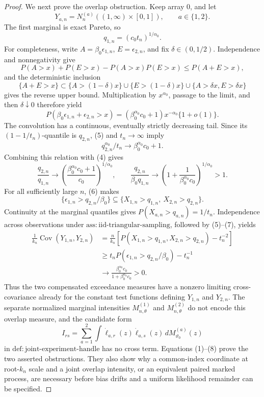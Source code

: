 \documentclass{article}
\begin{document}
\begin{proof}
We next prove the overlap obstruction.  Keep array \(0\), and let
\[
 Y_{a,n}=N_n^{(a)}((1,\infty)\times[0,1]),
 \qquad a\in\{1,2\}.
\]
The first marginal is exact Pareto, so
\[
 q_{1,n}=(c_0t_n)^{1/\alpha_0}. \tag{4}
\]
For completeness, write \(A=\beta_0\epsilon_{1,n}\), \(E=\epsilon_{2,n}\), and fix \(\delta\in(0,1/2)\).  Independence and nonnegativity give
\[
 P(A>x)+P(E>x)-P(A>x)P(E>x)
 \leq P(A+E>x),
\]
and the deterministic inclusion
\[
 \{A+E>x\}\subset
 \{A>(1-\delta)x\}\cup\{E>(1-\delta)x\}
 \cup\{A>\delta x,E>\delta x\}
\]
gives the reverse upper bound.  Multiplication by \(x^{\alpha_0}\), passage to the limit, and then \(\delta\downarrow0\) therefore yield
\[
 P(\beta_0\epsilon_{1,n}+\epsilon_{2,n}>x)
 =(\beta_0^{\alpha_0}c_0+1)x^{-\alpha_0}\{1+o(1)\}. \tag{5}
\]
The convolution has a continuous, eventually strictly decreasing tail.  Since its \((1-1/t_n)\)-quantile is \(q_{2,n}\), (5) and \(t_n\to\infty\) imply
\[
 q_{2,n}^{\alpha_0}/t_n\longrightarrow
 \beta_0^{\alpha_0}c_0+1.
\]
Combining this relation with (4) gives
\[
 \frac{q_{2,n}}{q_{1,n}}
 \longrightarrow
 \left(\frac{\beta_0^{\alpha_0}c_0+1}{c_0}\right)^{1/\alpha_0},
 \qquad
 \frac{q_{2,n}}{\beta_0q_{1,n}}
 \longrightarrow
 \left(1+\frac1{\beta_0^{\alpha_0}c_0}\right)^{1/\alpha_0}>1. \tag{6}
\]
For all sufficiently large \(n\), (6) makes
\[
 \{\epsilon_{1,n}>q_{2,n}/\beta_0\}
 \subseteq
 \{X_{1,n}>q_{1,n},\ X_{2,n}>q_{2,n}\}. \tag{7}
\]
Continuity at the marginal quantiles gives \(P(X_{a,n}>q_{a,n})=1/t_n\).  Independence across observations under \(\mathrm{ass{:}iid\text{-}triangular\text{-}sampling}\), followed by (5)--(7), yields
\[
\begin{aligned}
 \frac1{k_n}\operatorname{Cov}(Y_{1,n},Y_{2,n})
 &=\frac n{k_n}\left[
 P(X_{1,n}>q_{1,n},X_{2,n}>q_{2,n})-t_n^{-2}\right]\\
 &\geq t_nP(\epsilon_{1,n}>q_{2,n}/\beta_0)-t_n^{-1}\\
 &\longrightarrow
 \frac{\beta_0^{\alpha_0}c_0}{1+\beta_0^{\alpha_0}c_0}>0.
\end{aligned}\tag{8}
\]
Thus the two compensated exceedance measures have a nonzero limiting cross-covariance already for the constant test functions defining \(Y_{1,n}\) and \(Y_{2,n}\).  The separate normalized marginal intensities \(M_{n,\theta}^{(1)}\) and \(M_{n,\theta}^{(2)}\) do not encode this overlap measure, and the candidate form
\[
 I_{rs}=\sum_{a=1}^2\int
 \dot\ell_{a,r}(z)\dot\ell_{a,s}(z)\,dM_{\vartheta_0}^{(a)}(z)
\]
in \(\mathrm{def{:}joint\text{-}experiment\text{-}handle}\) has no cross term.  Equations (1)--(8) prove the two asserted obstructions.  They also show why a common-index coordinate at root-\(k_n\) scale and a joint overlap intensity, or an equivalent paired marked process, are necessary before bias drifts and a uniform likelihood remainder can be specified.
\end{proof}
\end{document}
